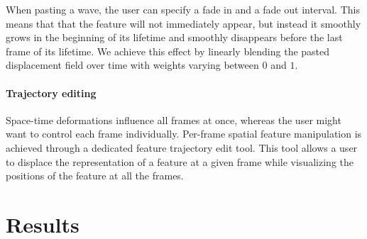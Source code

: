 When pasting a wave, the user can specify a fade in and a fade out interval. 
This means that that the feature will not immediately appear, but instead it smoothly grows in the beginning of its lifetime and smoothly disappears before the last frame of its lifetime. 
We achieve this effect by linearly blending the pasted displacement field over time with weights varying between $0$ and $1$.

\paragraph{Trajectory editing}

Space-time deformations influence all frames at once, whereas the user might want to control each frame individually.
Per-frame spatial feature manipulation is achieved through a dedicated feature trajectory edit tool.
This tool allows a user to displace the representation of a feature at a given frame while visualizing the positions of the feature at all the frames.

\section{Results} \label{sec:fluidsculpting:results}

